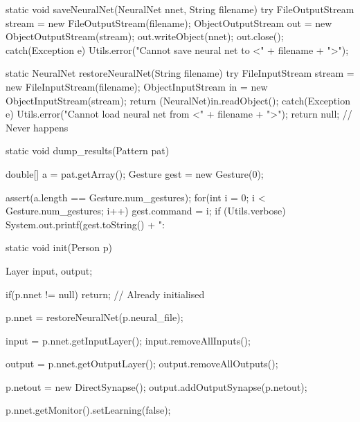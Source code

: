 \documentclass[12pt,a4,notitlepage]{report}
\renewcommand{\_}{\texttt{\symbol{95}}}
\newcommand{\<}{\texttt{\symbol{60}}}
\renewcommand{\>}{\texttt{\symbol{62}}}
\begin{document}
\begin{code}
{	static void saveNeuralNet(NeuralNet nnet, String filename)	
	{
		try
		{
			FileOutputStream stream = new FileOutputStream(filename);
			ObjectOutputStream out = new ObjectOutputStream(stream);
			out.writeObject(nnet);
			out.close();
		}
		catch(Exception e)
		{
			Utils.error("Cannot save neural net to <" + filename + ">");
		}
	}
		
	static NeuralNet restoreNeuralNet(String filename)
	{
		try
		{
			FileInputStream stream = new FileInputStream(filename);
			ObjectInputStream in = new ObjectInputStream(stream);
			return (NeuralNet)in.readObject();
		}
		catch(Exception e)
		{
			Utils.error("Cannot load neural net from <" + filename + ">");
		}
		return null; // Never happens
	}
	
	static void dump_results(Pattern pat)
	{
		double[] a = pat.getArray();
		Gesture gest = new Gesture(0);
		
		assert(a.length == Gesture.num_gestures);
		for(int i = 0; i < Gesture.num_gestures; i++)
		{
			gest.command = i;
			if (Utils.verbose)
				System.out.printf(gest.toString() + ": %
		}
	}
	
	static void init(Person p)
	{
		Layer input, output;

		if(p.nnet != null)
			return; // Already initialised
			
		p.nnet = restoreNeuralNet(p.neural_file);
		
		input = p.nnet.getInputLayer();
		input.removeAllInputs();
		
		output = p.nnet.getOutputLayer();
		output.removeAllOutputs();
		
		p.netout = new DirectSynapse();
		output.addOutputSynapse(p.netout);
		
		p.nnet.getMonitor().setLearning(false);
	}
}
\end{code}
\end{document}
